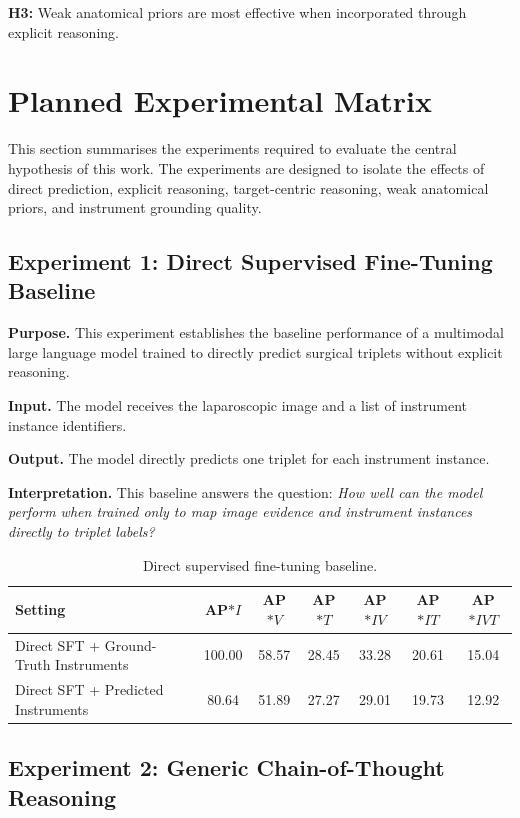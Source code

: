 \documentclass[11pt]{article}
\begin{document}
\textbf{H3:} Weak anatomical priors are most effective when incorporated through explicit reasoning.

\section{Planned Experimental Matrix}
This section summarises the experiments required to evaluate the central hypothesis of this work. The experiments are designed to isolate the effects of direct prediction, explicit reasoning, target-centric reasoning, weak anatomical priors, and instrument grounding quality.

\subsection{Experiment 1: Direct Supervised Fine-Tuning Baseline}

\textbf{Purpose.}
This experiment establishes the baseline performance of a multimodal large language model trained to directly predict surgical triplets without explicit reasoning.

\textbf{Input.}
The model receives the laparoscopic image and a list of instrument instance identifiers.

\textbf{Output.}
The model directly predicts one triplet for each instrument instance.

\textbf{Interpretation.}
This baseline answers the question: \emph{How well can the model perform when trained only to map image evidence and instrument instances directly to triplet labels?}

\begin{table}[H]
\centering
\caption{Direct supervised fine-tuning baseline.}
\begin{tabular}{lcccccc}
\toprule
Setting & AP$*I$ & AP$*V$ & AP$*T$ & AP$*{IV}$ & AP$*{IT}$ & AP$*{IVT}$ \\
\midrule
Direct SFT + Ground-Truth Instruments & 100.00 & 58.57 & 28.45 & 33.28 & 20.61 & 15.04 \\
Direct SFT + Predicted Instruments & 80.64 & 51.89 & 27.27 & 29.01 & 19.73 & 12.92 \\
\bottomrule
\end{tabular}
\label{tab:direct_sft}
\end{table}

\subsection{Experiment 2: Generic Chain-of-Thought Reasoning}
\end{document}
